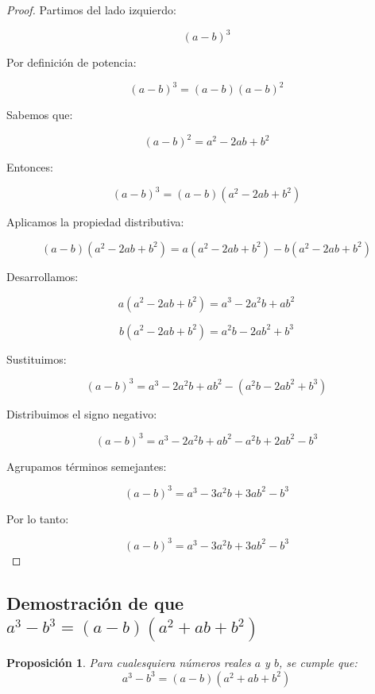 \documentclass[12pt,final]{report}
\theoremstyle{plain}
\newtheorem{proposition}[theorem]{Proposición}
\theoremstyle{definition}
\begin{document}
\begin{proof}

Partimos del lado izquierdo:

\[
(a-b)^3
\]

Por definición de potencia:

\[
(a-b)^3=(a-b)(a-b)^2
\]

Sabemos que:

\[
(a-b)^2=a^2-2ab+b^2
\]

Entonces:

\[
(a-b)^3=(a-b)(a^2-2ab+b^2)
\]

Aplicamos la propiedad distributiva:

\[
(a-b)(a^2-2ab+b^2)=a(a^2-2ab+b^2)-b(a^2-2ab+b^2)
\]

Desarrollamos:

\[
a(a^2-2ab+b^2)=a^3-2a^2b+ab^2
\]

\[
b(a^2-2ab+b^2)=a^2b-2ab^2+b^3
\]

Sustituimos:

\[
(a-b)^3=a^3-2a^2b+ab^2-(a^2b-2ab^2+b^3)
\]

Distribuimos el signo negativo:

\[
(a-b)^3=a^3-2a^2b+ab^2-a^2b+2ab^2-b^3
\]

Agrupamos términos semejantes:

\[
(a-b)^3=a^3-3a^2b+3ab^2-b^3
\]

Por lo tanto:

\[
(a-b)^3=a^3-3a^2b+3ab^2-b^3
\]

\end{proof}

\newpage

\subsection{Demostración de que $a^3-b^3=(a-b)(a^2+ab+b^2)$}

\begin{proposition}
Para cualesquiera números reales $a$ y $b$, se cumple que:
\[
a^3-b^3=(a-b)(a^2+ab+b^2)
\]
\end{proposition}
\end{document}
